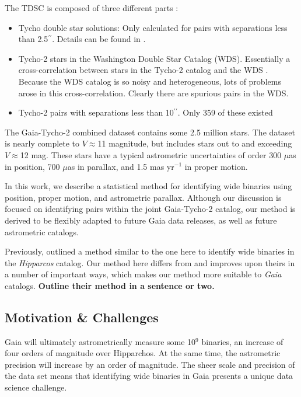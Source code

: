 \documentclass[usenatbib]{mnras}
\newcommand{\asec}{\ifmmode {^{\prime\prime}}\else$^{\prime\prime}$\fi}
\begin{document}
The TDSC is composed of three different parts \citep{fabricius02}:
\begin{itemize}
\item Tycho double star solutions: Only calculated for pairs with separations less than 2.5\asec. Details can be found in \citet{hog00a}.\\
\item Tycho-2 stars in the Washington Double Star Catalog (WDS). Essentially a cross-correlation between stars in the Tycho-2 catalog and the WDS \citep{mason00}. Because the WDS catalog is so noisy and heterogeneous, lots of problems arose in this cross-correlation. Clearly there are spurious pairs in the WDS. \\
\item Tycho-2 pairs with separations less than 10\asec. Only 359 of these existed
\end{itemize}


The Gaia-Tycho-2 combined dataset contains some 2.5 million stars. The dataset is nearly complete to $V\approx$11 magnitude, but includes stars out to and exceeding $V\approx$12 mag. These stars have a typical astrometric uncertainties of order 300 $\mu$as in position, 700 $\mu$as in parallax, and 1.5 mas yr$^{-1}$ in proper motion. 





In this work, we describe a statistical method for identifying wide binaries using position, proper motion, and astrometric parallax. Although our discussion is focused on identifying pairs within the joint Gaia-Tycho-2 catalog, our method is derived to be flexibly adapted to future Gaia data releases, as well as future astrometric catalogs.

Previously, \citet{shaya11} outlined a method similar to the one here to identify wide binaries in the {\it Hipparcos} catalog. Our method here differs from and improves upon theirs in a number of important ways, which makes our method more suitable to {\it Gaia} catalogs. {\bf Outline their method in a sentence or two.}




\subsection{Motivation \& Challenges}
\label{sec:motivation}

Gaia will ultimately astrometrically measure some 10$^9$ binaries, an increase of four orders of magnitude over Hipparchos. At the same time, the astrometric precision will increase by an order of magnitude. The sheer scale and precision of the data set means that identifying wide binaries in Gaia presents a unique data science challenge.
\end{document}
